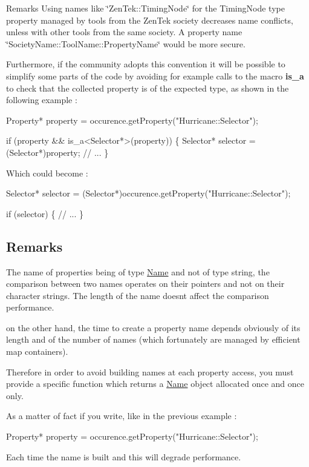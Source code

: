 \begin{DoxyRemark}{Remarks}
Using names like \char`\"{}\+Zen\+Tek\+::\+Timing\+Node\char`\"{} for the Timing\+Node type property managed by tools from the Zen\+Tek society decreases name conflicts, unless with other tools from the same society. A property name \char`\"{}\+Society\+Name\+::\+Tool\+Name\+::\+Property\+Name\char`\"{} would be more secure.
\end{DoxyRemark}
Furthermore, if the community adopts this convention it will be possible to simplify some parts of the code by avoiding for example calls to the macro {\bfseries is\+\_\+a} to check that the collected property is of the expected type, as shown in the following example \+: 
\begin{DoxyCode}
Property* \textcolor{keyword}{property} = occurence.getProperty(\textcolor{stringliteral}{"Hurricane::Selector"});
 
\textcolor{keywordflow}{if} (property && is\_a<Selector*>(property)) \{
  Selector* selector = (Selector*)property;
  \textcolor{comment}{// ...}
\}
\end{DoxyCode}
 Which could become \+: 
\begin{DoxyCode}
Selector* selector = (Selector*)occurence.getProperty(\textcolor{stringliteral}{"Hurricane::Selector"});
 
\textcolor{keywordflow}{if} (selector) \{
  \textcolor{comment}{// ...}
\}
\end{DoxyCode}
\hypertarget{classHurricane_1_1Property_secPropertyRemarks}{}\subsection{Remarks}\label{classHurricane_1_1Property_secPropertyRemarks}
The name of properties being of type \mbox{\hyperlink{classHurricane_1_1Name}{Name}} and not of type string, the comparison between two names operates on their pointers and not on their character strings. The length of the name doesn\textquotesingle{}t affect the comparison performance.

on the other hand, the time to create a property name depends obviously of its length and of the number of names (which fortunately are managed by efficient map containers).

Therefore in order to avoid building names at each property access, you must provide a specific function which returns a \mbox{\hyperlink{classHurricane_1_1Name}{Name}} object allocated once and once only.

As a matter of fact if you write, like in the previous example \+: 
\begin{DoxyCode}
Property* \textcolor{keyword}{property} = occurence.getProperty(\textcolor{stringliteral}{"Hurricane::Selector"});
\end{DoxyCode}
 Each time the name is built and this will degrade performance.

